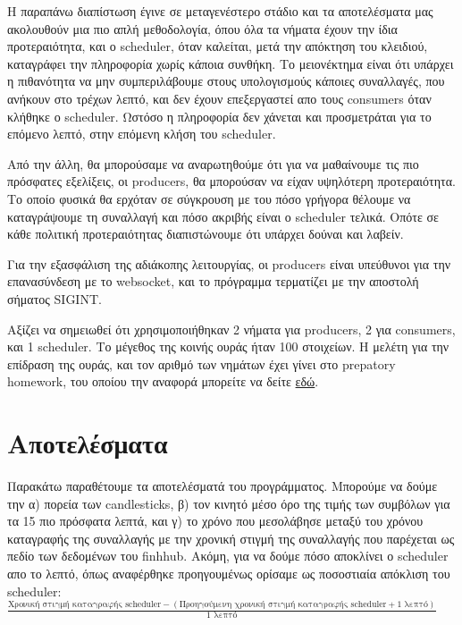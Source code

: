 \documentclass[12pt, a4paper]{article}
\begin{document}
Η παραπάνω διαπίστωση έγινε σε μεταγενέστερο στάδιο και τα αποτελέσματα μας ακολουθούν μια πιο απλή μεθοδολογία, όπου όλα τα νήματα έχουν την ίδια προτεραιότητα, και ο scheduler, όταν καλείται, μετά την απόκτηση του κλειδιού, καταγράφει την πληροφορία χωρίς κάποια συνθήκη. Το μειονέκτημα είναι ότι υπάρχει η πιθανότητα να μην συμπεριλάβουμε στους υπολογισμούς κάποιες συναλλαγές, που ανήκουν στο τρέχων λεπτό, και δεν έχουν επεξεργαστεί απο τους consumers όταν κλήθηκε ο scheduler. Ωστόσο η πληροφορία δεν χάνεται και προσμετράται για το επόμενο λεπτό, στην επόμενη κλήση του scheduler.

Από την άλλη, θα μπορούσαμε να αναρωτηθούμε ότι για να μαθαίνουμε τις πιο πρόσφατες εξελίξεις, οι producers, θα μπορούσαν να είχαν υψηλότερη προτεραιότητα. Το οποίο φυσικά θα ερχόταν σε σύγκρουση με του πόσο γρήγορα θέλουμε να καταγράψουμε τη συναλλαγή και πόσο ακριβής είναι ο scheduler τελικά. Οπότε σε κάθε πολιτική προτεραιότητας διαπιστώνουμε ότι υπάρχει δούναι και λαβείν.

Για την εξασφάλιση της αδιάκοπης λειτουργίας, οι producers είναι υπεύθυνοι για την επανασύνδεση με το websocket, και το πρόγραμμα τερματίζει με την αποστολή σήματος SIGINT.

Αξίζει να σημειωθεί ότι χρησιμοποιήθηκαν 2 νήματα για producers, 2 για consumers, και 1 scheduler. Το μέγεθος της κοινής ουράς ήταν 100 στοιχείων. Η μελέτη για την επίδραση της ουράς, και τον αριθμό των νημάτων έχει γίνει στο prepatory homework, του οποίου την αναφορά μπορείτε να δείτε \href{https://github.com/thodkatz/embedded-rtos/blob/master/producer_consumer/report.pdf}{εδώ}.


\section{Αποτελέσματα}

Παρακάτω παραθέτουμε τα αποτελέσματά του προγράμματος. Μπορούμε να δούμε την α) πορεία των candlesticks, β) τον κινητό μέσο όρο της τιμής των συμβόλων για τα 15 πιο πρόσφατα λεπτά, και γ) το χρόνο που μεσολάβησε μεταξύ του χρόνου καταγραφής της συναλλαγής με την χρονική στιγμή της συναλλαγής που παρέχεται ως πεδίο των δεδομένων του finhhub. Ακόμη, για να δούμε πόσο αποκλίνει ο scheduler απο το λεπτό, όπως αναφέρθηκε προηγουμένως ορίσαμε ως ποσοστιαία απόκλιση του scheduler:
$\frac{\text{Χρονική στιγμή καταγραφής scheduler} - (\text{Προηγούμενη χρονική στιγμή καταγραφής scheduler} + 1 \text{ λεπτό})}{1 \text{ λεπτό}}$
\end{document}
